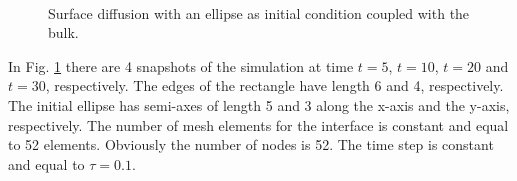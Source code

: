 \documentclass[a4paper,11pt, onecolumn]{article}
\begin{document}
\begin{figure}[htbp]
 \centering
 \quad
 \\
 \quad
 \caption{Surface diffusion with an ellipse as initial condition coupled with
the bulk.}
 \label{fig:sd_ellipse_bulk}
\end{figure}

In Fig. \ref{fig:sd_ellipse_bulk} there are 4 snapshots of the simulation at
time $t=5$, $t=10$, $t=20$ and $t=30$, respectively. The edges of the rectangle
have length 6 and 4, respectively. The initial ellipse has semi-axes of length 5
and 3 along the x-axis and the y-axis, respectively. The number of mesh elements
for the interface is constant and equal to 52 elements. Obviously the number of
nodes is 52. The time step is constant and equal to $\tau=0.1$.
\newline
\end{document}
